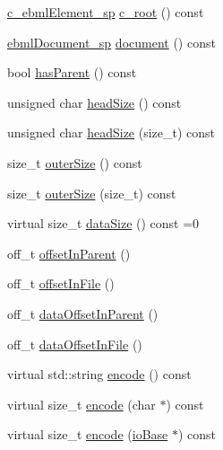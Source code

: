 \begin{DoxyCompactItemize}
\item 
\mbox{\hyperlink{namespaceebml_a2deef4e8071531b32e3533f1bf978917}{c\+\_\+ebml\+Element\+\_\+sp}} \mbox{\hyperlink{classebml_1_1ebmlElement_a3dddd3edbb6c96b8765107fccad5826b}{c\+\_\+root}} () const
\item 
\mbox{\hyperlink{namespaceebml_a66018942b568da5041136a945148b450}{ebml\+Document\+\_\+sp}} \mbox{\hyperlink{classebml_1_1ebmlElement_a1ee44e2978cd9e23c98cd9c05dd8fa35}{document}} () const
\item 
bool \mbox{\hyperlink{classebml_1_1ebmlElement_a9a784c3c424216ecd4b320e2cfc713b2}{has\+Parent}} () const
\item 
unsigned char \mbox{\hyperlink{classebml_1_1ebmlElement_a9305dc06339d900f81bd986653457e28}{head\+Size}} () const
\item 
unsigned char \mbox{\hyperlink{classebml_1_1ebmlElement_a87e926e72a5c1280b674573256dc08b1}{head\+Size}} (size\+\_\+t) const
\item 
size\+\_\+t \mbox{\hyperlink{classebml_1_1ebmlElement_aa6e265beb13dae353d75cdacc77748e1}{outer\+Size}} () const
\item 
size\+\_\+t \mbox{\hyperlink{classebml_1_1ebmlElement_ac482f4483500dbe1b9042350ee81c1be}{outer\+Size}} (size\+\_\+t) const
\item 
virtual size\+\_\+t \mbox{\hyperlink{classebml_1_1ebmlElement_a47ed4167d9c69104e02b6dbad0cd1fef}{data\+Size}} () const =0
\item 
off\+\_\+t \mbox{\hyperlink{classebml_1_1ebmlElement_a06ea720b5bd804288a8d36a36cf6b6a7}{offset\+In\+Parent}} ()
\item 
off\+\_\+t \mbox{\hyperlink{classebml_1_1ebmlElement_abcb13644652965ed7cfcd1c023569b1c}{offset\+In\+File}} ()
\item 
off\+\_\+t \mbox{\hyperlink{classebml_1_1ebmlElement_a0304c2cdd1694a706d8846e596d15ec6}{data\+Offset\+In\+Parent}} ()
\item 
off\+\_\+t \mbox{\hyperlink{classebml_1_1ebmlElement_a725798d0e8cee171475f133fa36b3324}{data\+Offset\+In\+File}} ()
\item 
virtual std\+::string \mbox{\hyperlink{classebml_1_1ebmlElement_aaeddd5ffc1da2f3d4f2a9c9ec1dbed4d}{encode}} () const
\item 
virtual size\+\_\+t \mbox{\hyperlink{classebml_1_1ebmlElement_a5aeddfac34c2c839873146be6c634aed}{encode}} (char $\ast$) const
\item 
virtual size\+\_\+t \mbox{\hyperlink{classebml_1_1ebmlElement_ad493e4103807b8d4434c0667c148dcea}{encode}} (\mbox{\hyperlink{classebml_1_1ioBase}{io\+Base}} $\ast$) const

\end{DoxyCompactItemize}
